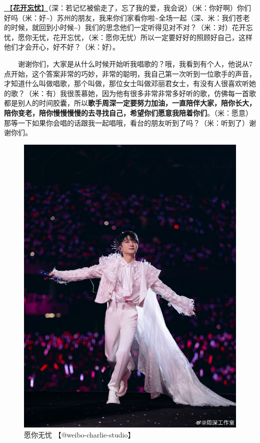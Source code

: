 \documentclass[]{ctexbook}
\begin{document}
\hyperref[no-worries]{🎵【\textbf{花开忘忧}】}（深：若记忆被偷走了，忘了我的爱，我会说）（米：你好啊）你们好吗（米：好\textasciitilde）苏州的朋友，我来你们家看你啦\textasciitilde 全场一起（深、米：我们苍老的时候，就回到小时候\textasciitilde）我们的思念他们一定听得见对不对？（米：对）花开忘忧，愿你无忧，花开忘忧，（米：愿你无忧）所以一定要好好的照顾好自己，这样他们才会开心，好不好？（米：好）。

  谢谢你们，大家是从什么时候开始听我唱歌的？哦，我看到有个人，他说从7点开始，这个答案非常的巧妙，非常的聪明，我自己第一次听到一位歌手的声音，才知道什么叫做唱歌，那个叫做，那位女士叫做邓丽君女士，有没有人很喜欢听她的歌？（米：有）我很羡慕她，因为他有很多非常非常多好听的歌，仿佛每一首歌都是别人的时间胶囊，所以\textbf{歌手周深一定要努力加油，一直陪伴大家，陪你长大，陪你变老，陪你慢慢慢慢的去寻找自己，希望你们愿意我陪着你们}。（米：愿意）那等一下如果你会唱的话跟我一起唱哦，看台的朋友听到了吗？（米：听到了）谢谢你们。

\begin{figure}

{\centering \includegraphics[width=400pt]{img/suzhou20241109/003} 

}

\caption{愿你无忧 【@weibo-charlie-studio】}\label{fig:unnamed-chunk-126}
\end{figure}
\end{document}
